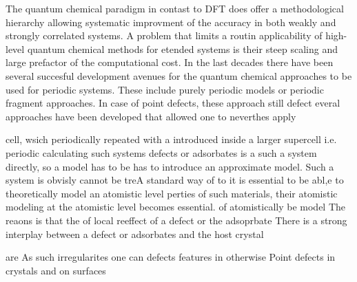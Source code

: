 \documentclass[a4paper,11pt,headings=normal]{scrartcl}
\begin{document}
The quantum chemical paradigm in contast to DFT does offer a methodological hierarchy allowing systematic improvment of the accuracy in both weakly and strongly correlated systems. A problem that limits a routin applicability of high-level quantum chemical methods for etended systems is their steep scaling and large prefactor of the computational cost. In the last decades there have been several succesful development avenues for the quantum chemical approaches to be used for periodic systems. These include purely periodic models\cite{..} or periodic fragment approaches.\cite{..} In case of point defects, these approach still defect everal approaches have been developed that allowed one to neverthes apply 

cell, wsich periodically repeated with a introduced inside a larger supercell  i.e. periodic    calculating such systems  defects or adsorbates is a  such a system directly, so a model has to be  has to introduce an approximate model.  Such a system is obvisly cannot be treA standard way of   to it is essential to be abl,e to theoretically model an atomistic level perties of such materials, their atomistic modeling at the atomistic level becomes essential. of  atomistically be model      The reaons is that the  of      local reeffect of a defect or the adsoprbate  There is a strong interplay between a defect or adsorbates and the host crystal 



are   As such irregularites one can defects      features in otherwise Point defects in crystals and on surfaces  
\end{document}
